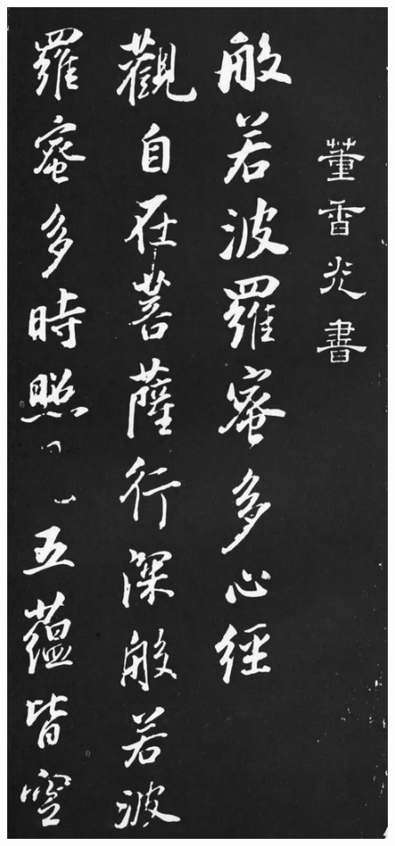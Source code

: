 \documentclass[a4paper,twoside]{article}
\begin{document}
\begin{figure}[ht]
\centering
\includegraphics[width=11.2cm]{images/dongqichang-1}
\end{figure}
\end{document}
